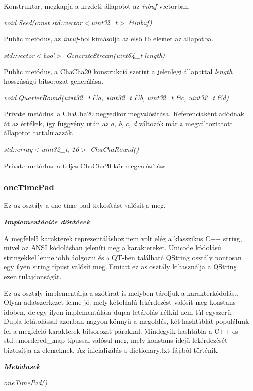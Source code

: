 \documentclass[hidelinks, 12pt]{article}
\begin{document}
Konstruktor, megkapja a kezdeti állapotot az \textit{inbuf} vectorban.

\textit{void Seed(const std::vector$<$uint32\_t$>$ \&inbuf)}

Public metódus, az \textit{inbuf}-ból kimásolja az első 16 elemet az állapotba.

\textit{std::vector$<$bool$>$ GenerateStream(uint64\_t length)}

Public metódus, a ChaCha20 konstrukció szerint a jelenlegi állapottal \textit{length} hosszúságú bitsorozat generálása.

\textit{void QuarterRound(uint32\_t \&a, uint32\_t \&b, uint32\_t \&c, uint32\_t \&d)}

Private metódus, a ChaCha20 negyedkör megvalósítása. Referenciaként adódnak át az értékek, így függvény után az \textit{a}, \textit{b}, \textit{c}, \textit{d} változók már a megváltoztatott állapotot tartalmazzák.

\textit{std::array$<$uint32\_t, 16$>$ ChaChaRound()}

Private metódus, a teljes ChaCha20 kör megvalósítása.

\subsubsection*{oneTimePad}
Ez az osztály a one-time pad titkosítást valósítja meg.

\textit{\textbf{Implementációs döntések}}

A megfelelő karakterek reprezentáláshoz nem volt elég a klasszikus C++ string, mivel az ANSI kódolásban jeleníti meg a karaktereket. Unicode kódolású stringekkel lenne jobb dolgozni és a QT-ben található QString osztály pontosan egy ilyen string típust valósít meg. Emiatt ez az osztály kihasználja a QString ezen tulajdonságát.

Ez az osztály implementálja a szótárat is melyben tároljuk a karakterkódolást. Olyan adatszerkezet lenne jó, mely kétoldalú lekérdezést valósít meg konstans időben, de egy ilyen implementálása dupla letárolás nélkül nem túl egyszerű. Dupla letárolással azonban nagyon könnyű a megoldás, két hashtáblát populálunk fel a megfelelő karakterek-bitsorozat párokkal. Mindegyik hashtábla a C++-os std::unordered\_map típussal valósul meg, mely konstans idejű lekérdezését biztosítja az elemeknek. Az inicializálás a dictionary.txt fájlból történik.

\textit{\textbf{Metódusok}}

\textit{oneTimePad()}
\end{document}
